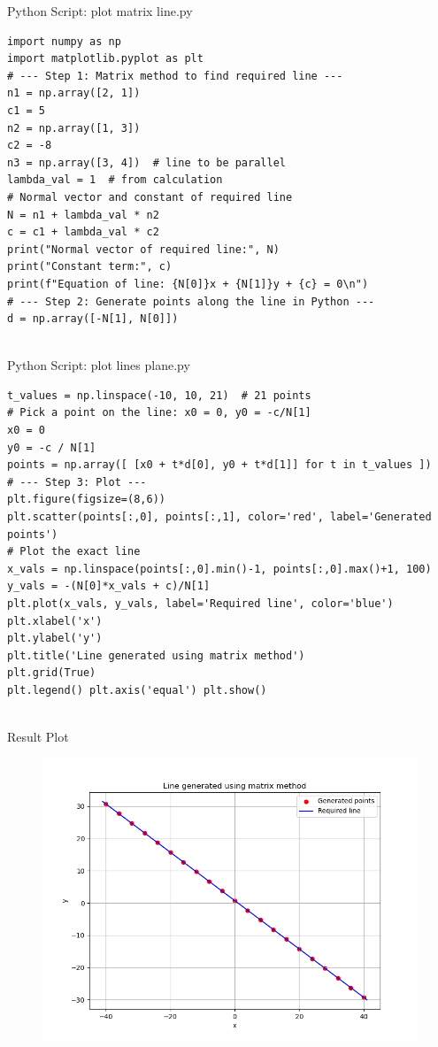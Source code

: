 \documentclass{beamer}
\numberwithin{equation}{section}
\theoremstyle{remark}
\begin{document}
\begin{frame}[fragile]{Python Script: plot matrix line.py}
\begin{verbatim}
import numpy as np
import matplotlib.pyplot as plt
# --- Step 1: Matrix method to find required line ---
n1 = np.array([2, 1])
c1 = 5
n2 = np.array([1, 3])
c2 = -8
n3 = np.array([3, 4])  # line to be parallel
lambda_val = 1  # from calculation
# Normal vector and constant of required line
N = n1 + lambda_val * n2
c = c1 + lambda_val * c2
print("Normal vector of required line:", N)
print("Constant term:", c)
print(f"Equation of line: {N[0]}x + {N[1]}y + {c} = 0\n")
# --- Step 2: Generate points along the line in Python ---
d = np.array([-N[1], N[0]])


\end{verbatim}
\end{frame}
\begin{frame}[fragile]{Python Script: plot lines plane.py}
\begin{verbatim}
t_values = np.linspace(-10, 10, 21)  # 21 points
# Pick a point on the line: x0 = 0, y0 = -c/N[1]
x0 = 0
y0 = -c / N[1]
points = np.array([ [x0 + t*d[0], y0 + t*d[1]] for t in t_values ])
# --- Step 3: Plot ---
plt.figure(figsize=(8,6))
plt.scatter(points[:,0], points[:,1], color='red', label='Generated points')
# Plot the exact line
x_vals = np.linspace(points[:,0].min()-1, points[:,0].max()+1, 100)
y_vals = -(N[0]*x_vals + c)/N[1]
plt.plot(x_vals, y_vals, label='Required line', color='blue')
plt.xlabel('x')
plt.ylabel('y')
plt.title('Line generated using matrix method')
plt.grid(True)
plt.legend() plt.axis('equal') plt.show()


\end{verbatim}
\end{frame}

\begin{frame}{Result Plot}
 \begin{figure}[H]
     \centering
     \includegraphics[width=0.7\columnwidth]{figs/fig1.png}
     \caption*{}
     \label{fig:fig1}
 \end{figure}
 
\end{frame}
\end{document}
